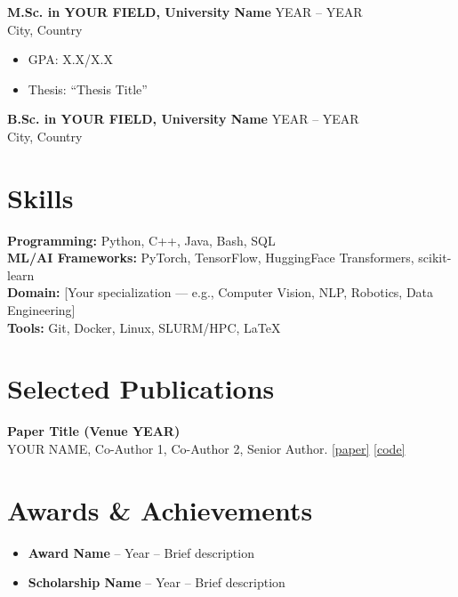 \documentclass[10pt,a4paper]{article}
\begin{document}
\textbf{M.Sc. in YOUR FIELD, University Name} \hfill YEAR -- YEAR\\
City, Country
\begin{itemize}
    \item GPA: X.X/X.X
    \item Thesis: ``Thesis Title''
\end{itemize}

\textbf{B.Sc. in YOUR FIELD, University Name} \hfill YEAR -- YEAR\\
City, Country

\section*{Skills}

\textbf{Programming:} Python, C++, Java, Bash, SQL\\
\textbf{ML/AI Frameworks:} PyTorch, TensorFlow, HuggingFace Transformers, scikit-learn\\
\textbf{Domain:} [Your specialization — e.g., Computer Vision, NLP, Robotics, Data Engineering]\\
\textbf{Tools:} Git, Docker, Linux, SLURM/HPC, LaTeX

\section*{Selected Publications}

\textbf{Paper Title (Venue YEAR)}\\
YOUR NAME, Co-Author 1, Co-Author 2, Senior Author.
\href{https://link-to-paper}{[paper]}
\href{https://github.com/...}{[code]}


\section*{Awards \& Achievements}

\begin{itemize}
    \item \textbf{Award Name} -- Year -- Brief description
    \item \textbf{Scholarship Name} -- Year -- Brief description
\end{itemize}
\end{document}
